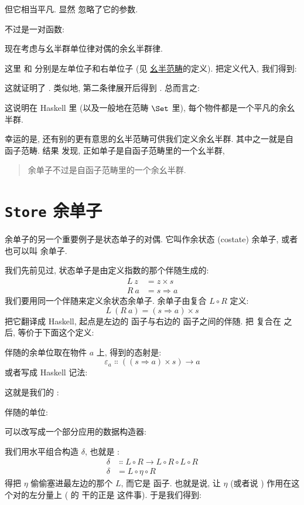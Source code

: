 但它相当平凡. 显然  忽略了它的参数.

 不过是一对函数:

现在考虑与幺半群单位律对偶的余幺半群律.

这里  和  分别是左单位子和右单位子 (见
\hyperref[monads-categorically]{幺半范畴}的定义). 把定义代入, 我们得到:

这就证明了 . 类似地, 第二条律展开后得到 . 总而言之:

这说明在 Haskell 里 (以及一般地在范畴 $\Set$ 里), 每个物件都是一个平凡的余幺半群.

幸运的是, 还有别的更有意思的幺半范畴可供我们定义余幺半群. 其中之一就是自函子范畴. 结果
发现, 正如单子是自函子范畴里的一个幺半群,

\begin{quote}
  余单子不过是自函子范畴里的一个余幺半群.
\end{quote}

\section{\texttt{Store} 余单子}

余单子的另一个重要例子是状态单子的对偶. 它叫作余状态 (costate) 余单子, 或者也可以叫
 余单子.

我们先前见过, 状态单子是由定义指数的那个伴随生成的:
\begin{align*}
  L\ z & = z\times{}s      \\
  R\ a & = s \Rightarrow a
\end{align*}
我们要用同一个伴随来定义余状态余单子. 余单子由复合 $L \circ R$ 定义:
\[L\ (R\ a) = (s \Rightarrow a)\times{}s\]
把它翻译成 Haskell, 起点是左边的  函子与右边的  函子之间的伴随.
把  复合在  之后, 等价于下面这个定义:

伴随的余单位取在物件 $a$ 上, 得到的态射是:
\[\varepsilon_a \Colon ((s \Rightarrow a)\times{}s) \to a\]
或者写成 Haskell 记法:

这就是我们的 :

伴随的单位:

可以改写成一个部分应用的数据构造器:

我们用水平组合构造 $\delta$, 也就是 :
\begin{align*}
  \delta & \Colon L \circ R \to L \circ R \circ L \circ R \\
  \delta & = L \circ \eta \circ R
\end{align*}
得把 $\eta$ 偷偷塞进最左边的那个 $L$, 而它是  函子. 也就是说, 让 $\eta$
(或者说 ) 作用在这个对的左分量上 ( 的  干的正是
这件事). 于是我们得到:

